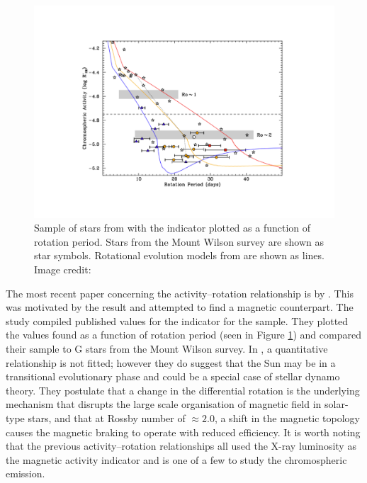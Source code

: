 \begin{figure}
    \centering
    \includegraphics[scale=0.55]{Figures/2-Historical_overview/metcalfe_etal_2016_fig1.pdf}
    \caption[Chromospheric emission as a function of rotation period for sample of older stars]{Sample of stars from \citet{Metcalfe_etal_2016} with the \Rprime indicator plotted as a function of rotation period. Stars from the Mount Wilson survey are shown as star symbols. Rotational evolution models from \citet{van_Saders_etal_2016} are shown as lines. Image credit: \citet{Metcalfe_etal_2016}}
    \label{fig:metcalfe_etal_2016_plot}
\end{figure}

The most recent paper concerning the activity--rotation relationship is by \citet{Metcalfe_etal_2016}. This was motivated by the \citet{van_Saders_etal_2016} result and attempted to find a magnetic counterpart. The study compiled published values for the \Rprime indicator for the \citet{van_Saders_etal_2016} sample. They plotted the values found as a function of rotation period (seen in Figure \ref{fig:metcalfe_etal_2016_plot}) and compared their sample to G stars from the Mount Wilson survey. In \citet{Metcalfe_etal_2016}, a quantitative relationship is not fitted; however they do suggest that the Sun may be in a transitional evolutionary phase and could be a special case of stellar dynamo theory. They postulate that a change in the differential rotation is the underlying mechanism that disrupts the large scale organisation of magnetic field in solar-type stars, and that at Rossby number of $\approx 2.0$, a shift in the magnetic topology causes the magnetic braking to operate with reduced efficiency. It is worth noting that the previous activity--rotation relationships all used the X-ray luminosity as the magnetic activity indicator and \citet{Metcalfe_etal_2016} is one of a few to study the chromospheric emission.

